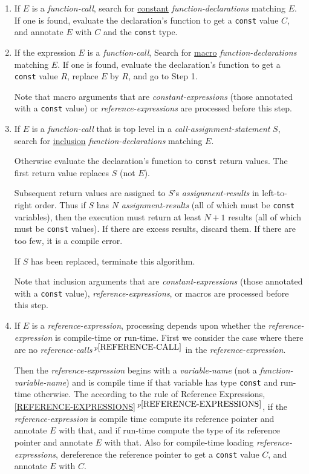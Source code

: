 \documentclass[12pt]{article}
\newcommand{\itemref}[1]{\ref{#1}$\,^{p\pageref{#1}}$}
\newcommand{\pagnote}[1]{$\,^{p\pageref{#1}}$}
\begin{document}
\begin{enumerate}
\item\label{CONSTANT-FUNCTION-STEP}
If $E$ is a {\em function-call},
search for \underline{constant} {\em function-declarations}
matching $E$.  If one is found,
evaluate the declaration's function to get a {\tt const} value $C$,
and annotate $E$ with $C$ and the {\tt const} type.

\item\label{MACRO-FUNCTION-STEP}
If the expression $E$ is a {\em function-call},
Search for \underline{macro} {\em function-declarations}
matching $E$.  If one is found,
evaluate the declaration's function to get a {\tt const} value $R$,
replace $E$ by $R$, and go to Step 1.

Note that macro arguments that are {\em constant-expressions}
(those annotated with a {\tt const} value) or {\em reference-expressions}
are processed before this step.

\item\label{INCLUSION-FUNCTION-STEP}
If $E$ is a {\em function-call}
that is top level in a {\em call-assignment-statement} $S$,
search for \underline{inclusion} {\em function-declarations}
matching $E$.

Otherwise evaluate the declaration's function to {\tt const} return values.
The first return value replaces $S$ (not $E$).

Subsequent return values are assigned to $S$'s {\em assignment-results}
in left-to-right order.
Thus if $S$
has $N$ {\em assignment-results} (all of which must be {\tt const} variables),
then the execution must return at
least $N+1$ results (all of which must be {\tt const} values).
If there are excess results, discard them.  If there are too few,
it is a compile error.

If $S$ has been replaced, terminate this algorithm.

Note that inclusion arguments that are {\em constant-expressions}
(those annotated with a {\tt const} value), {\em reference-expressions},
or macros are processed before this step.

\item\label{REFERENCE-EXPRESSION-STEP}
If $E$ is a {\em reference-expression}, processing depends upon whether
the {\em reference-expres\-sion} is compile-time or run-time.
First we consider the case where there are no
{\em reference-calls}\pagnote{REFERENCE-CALL} in the
{\em reference-expression}.

Then the {\em reference-expression} begins with a {\em variable-name}
(not a {\em function-variable-name}) and is compile time if that
variable has type {\tt const} and run-time otherwise.
The according to the rule of
Reference Expressions, \itemref{REFERENCE-EXPRESSIONS},
if the {\em reference-expression} is compile time compute its reference pointer
and annotate $E$ with that, and if run-time compute the type of its
reference pointer and annotate $E$ with that.  Also for compile-time
loading {\em reference-expressions}, dereference the reference pointer
to get a {\tt const} value $C$, and annotate $E$ with $C$.


\end{enumerate}
\end{document}

